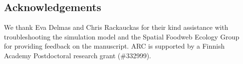 \documentclass[12pt]{article}
\begin{document}
\begin{spacing}{2.0}
\section*{Acknowledgements}

	We thank Eva Delmas and Chris Rackauckas for their kind assistance with troubleshooting the simulation model and the Spatial Foodweb Ecology Group for providing feedback on the manuscript. ARC is supported by a Finnish Academy Postdoctoral research grant (\#332999). 


\clearpage
     

\clearpage
\end{spacing}

\end{document}
